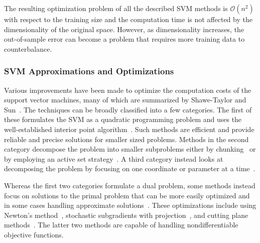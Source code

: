 The resulting optimization problem of all the described SVM methods is $\mathcal{O}(n^2)$ with respect to the training size and the computation time is not affected by the dimensionality of the original space.
%
However, as dimensionality increases, the out-of-sample error can become a problem that requires more training data to counterbalance.

\subsubsection{SVM Approximations and Optimizations}

Various improvements have been made to optimize the computation costs of the support vector machines, many of which are summarized by Shawe-Taylor and Sun~\cite{Shawe-TaylorSun2011}.
%
The techniques can be broadly classified into a few categories.
%
The first of these formulates the SVM as a quadratic programming problem and uses the well-established interior point algorithm~\cite{BoydVandenberghe2004,FineScheinberg2002,FerrisMunson2002,ScholkopfSmola2001}.
%
Such methods are efficient and provide reliable and precise solutions for smaller sized problems.
%
Methods in the second category decompose the problem into smaller subproblems either by chunking~\cite{BordesErtekinWeston2005,ChangLin2011,Joachims1999,OsunaFreundGirosi1997,Platt1998,Vapnik1982,ZanniSerafiniZanghirati2006} or by employing an active set strategy~\cite{CauwenberghsPoggio2000,HastieRossetTibshirani2004,Scheinberg2006,ShiltonPalaniswamiRalph2005}.
%
%
%
A third category instead looks at decomposing the problem by focusing on one
coordinate or parameter at a time~\cite{BordesBottouGallinari2007,FriessCristianiniCampbell1998,HsiehChangLin2008,MangasarianMusicant1999}.

Whereas the first two categories formulate a dual problem, some methods instead focus on solutions to the primal problem that can be more easily optimized and in some cases handling approximate solutions~\cite{BottouBousquet2008,Shalev-ShwartzSingerSrebro2011}.
%
These optimizations include using Newton's method~\cite{Chapelle2007,KeerthiDeCoste2005,LeeMangasarian2001,Mangasarian2002}, stochastic subgradients with projection~\cite{KivinenSmolaWilliamson2004,Shalev-ShwartzSingerSrebro2011,Zhang2004}, and cutting plane methods~\cite{FrancSonnenburg2008,Joachims2006,TeoSmolaVishwanathan2007}.
%
The latter two methods are capable of handling nondifferentiable objective functions.

